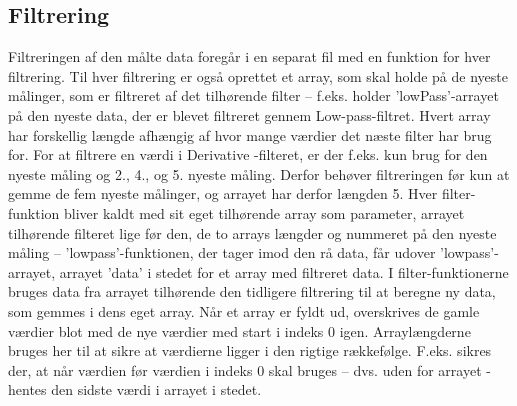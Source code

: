 \documentclass{article}
\begin{document}
\subsection{Filtrering}
Filtreringen af den målte data foregår i en separat fil med en funktion for hver filtrering. Til hver filtrering er også oprettet et array, som skal holde på de nyeste målinger, som er filtreret af det tilhørende filter – f.eks. holder ’lowPass’-arrayet på den nyeste data, der er blevet filtreret gennem Low-pass-filtret. Hvert array har forskellig længde afhængig af hvor mange værdier det næste filter har brug for. For at filtrere en værdi i Derivative -filteret, er der f.eks. kun brug for den nyeste måling og 2., 4., og 5. nyeste måling. Derfor behøver filtreringen før kun at gemme de fem nyeste målinger, og arrayet har derfor længden 5.
Hver filter-funktion bliver kaldt med sit eget tilhørende array som parameter, arrayet tilhørende filteret lige før den, de to arrays længder og nummeret på den nyeste måling – ’lowpass’-funktionen, der tager imod den rå data, får udover ’lowpass’-arrayet, arrayet ’data’ i stedet for et array med filtreret data. I filter-funktionerne bruges data fra arrayet tilhørende den tidligere filtrering til at beregne ny data, som gemmes i dens eget array. Når et array er fyldt ud, overskrives de gamle værdier blot med de nye værdier med start i indeks 0 igen. Arraylængderne bruges her til at sikre at værdierne ligger i den rigtige rækkefølge. F.eks. sikres der, at når værdien før værdien i indeks 0 skal bruges – dvs. uden for arrayet -  hentes den sidste værdi i arrayet i stedet.
\end{document}
